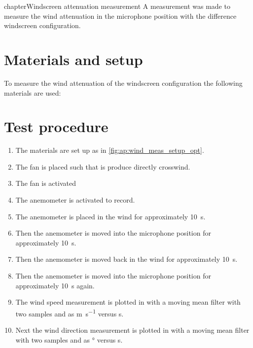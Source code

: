 chapter{Windscreen attenuation measurement}
A measurement was made to measure the wind attenuation in the microphone position with the difference windscreen configuration.


\section*{Materials and setup}
To measure the wind attenuation of the windscreen configuration the following materials are used:

\startequipment
{}
\stopequipment




\section*{Test procedure}


\begin{enumerate}
\item The materials are set up as in \autoref{fig:ap:wind_meas_setup_opt}.
\item The fan is placed such that is produce directly crosswind.
\item The fan is activated 
\item The anemometer is activated to record.
\item The anemometer is placed in the wind for approximately \SI{10}{\second}.
\item Then the anemometer is moved into the microphone position for approximately \SI{10}{\second}.
\item Then the anemometer is moved back in the wind for approximately \SI{10}{\second}.
\item Then the anemometer is moved into the microphone position for approximately \SI{10}{\second} again. 
\item The wind speed measurement is plotted in \matlab with a moving mean filter with two samples and as \si{\meter\per\second} versus \si{\second}.
\item Next the wind direction measurement is plotted in \matlab with a moving mean filter with two samples and as \si{\degree} versus \si{\second}.
\end{enumerate}


